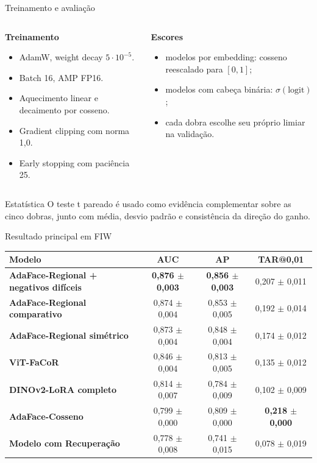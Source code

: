 \documentclass[aspectratio=169,10pt]{beamer}
\newcommand{\highlight}[1]{\textcolor{cefetblue}{\textbf{#1}}}
\begin{document}
\begin{frame}{Treinamento e avaliação}
  \begin{columns}[T,onlytextwidth]
    \begin{column}{0.48\textwidth}
      \textbf{Treinamento}
      \begin{itemize}
        \item AdamW, weight decay $5\cdot10^{-5}$.
        \item Batch 16, AMP FP16.
        \item Aquecimento linear e decaimento por cosseno.
        \item Gradient clipping com norma 1,0.
        \item Early stopping com paciência 25.
      \end{itemize}
    \end{column}
    \begin{column}{0.49\textwidth}
      \textbf{Escores}
      \begin{itemize}
        \item modelos por embedding: cosseno reescalado para $[0,1]$;
        \item modelos com cabeça binária: $\sigma(\text{logit})$;
        \item cada dobra escolhe seu próprio limiar na validação.
      \end{itemize}
    \end{column}
  \end{columns}

  \vspace{0.35cm}
  \begin{block}{Estatística}
    O teste t pareado é usado como evidência complementar sobre as cinco dobras, junto com média, desvio padrão e consistência da direção do ganho.
  \end{block}
\end{frame}

\begin{frame}{Resultado principal em FIW}
  \scriptsize
  \begin{tabularx}{\textwidth}{>{\bfseries}Yccc}
    \toprule
    Modelo & AUC & AP & TAR@0,01 \\
    \midrule
    AdaFace-Regional + negativos difíceis & \highlight{0,876 $\pm$ 0,003} & \highlight{0,856 $\pm$ 0,003} & 0,207 $\pm$ 0,011 \\
    AdaFace-Regional comparativo & 0,874 $\pm$ 0,004 & 0,853 $\pm$ 0,005 & 0,192 $\pm$ 0,014 \\
    AdaFace-Regional simétrico & 0,873 $\pm$ 0,004 & 0,848 $\pm$ 0,004 & 0,174 $\pm$ 0,012 \\
    ViT-FaCoR & 0,846 $\pm$ 0,004 & 0,813 $\pm$ 0,005 & 0,135 $\pm$ 0,012 \\
    DINOv2-LoRA completo & 0,814 $\pm$ 0,007 & 0,784 $\pm$ 0,009 & 0,102 $\pm$ 0,009 \\
    AdaFace-Cosseno & 0,799 $\pm$ 0,000 & 0,809 $\pm$ 0,000 & \highlight{0,218 $\pm$ 0,000} \\
    Modelo com Recuperação & 0,778 $\pm$ 0,008 & 0,741 $\pm$ 0,015 & 0,078 $\pm$ 0,019 \\
    \bottomrule
  \end{tabularx}
\end{frame}
\end{document}
